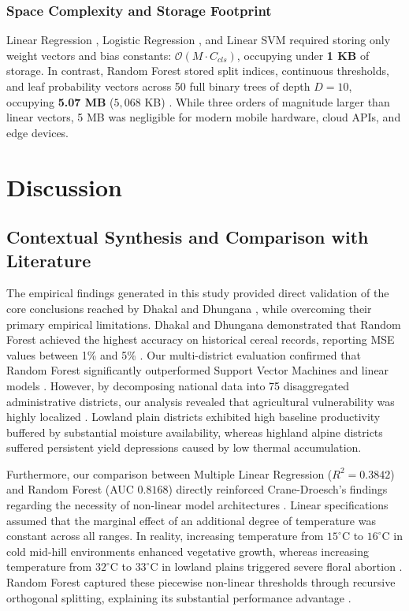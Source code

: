 \documentclass[conference]{IEEEtran}
\begin{document}
\subsubsection{Space Complexity and Storage Footprint}
Linear Regression \cite{hoerl1970}, Logistic Regression \cite{hastie2009}, and Linear SVM \cite{cortes1995} required storing only weight vectors and bias constants: $\mathcal{O}(M \cdot C_{cls})$, occupying under \textbf{1 KB} of storage. In contrast, Random Forest stored split indices, continuous thresholds, and leaf probability vectors across 50 full binary trees of depth $D=10$, occupying \textbf{5.07 MB} ($5,068$ KB) \cite{breiman2001}. While three orders of magnitude larger than linear vectors, 5 MB was negligible for modern mobile hardware, cloud APIs, and edge devices.

\section{Discussion}

\subsection{Contextual Synthesis and Comparison with Literature}
The empirical findings generated in this study provided direct validation of the core conclusions reached by Dhakal and Dhungana \cite{dhakal2023}, while overcoming their primary empirical limitations. Dhakal and Dhungana demonstrated that Random Forest achieved the highest accuracy on historical cereal records, reporting MSE values between 1\% and 5\% \cite{dhakal2023}. Our multi-district evaluation confirmed that Random Forest \cite{breiman2001} significantly outperformed Support Vector Machines \cite{cortes1995} and linear models \cite{hoerl1970}. However, by decomposing national data into 75 disaggregated administrative districts, our analysis revealed that agricultural vulnerability was highly localized \cite{macqueen1967}. Lowland plain districts exhibited high baseline productivity buffered by substantial moisture availability, whereas highland alpine districts suffered persistent yield depressions caused by low thermal accumulation.

Furthermore, our comparison between Multiple Linear Regression ($R^2 = 0.3842$) \cite{hoerl1970} and Random Forest (AUC $0.8168$) \cite{breiman2001} directly reinforced Crane-Droesch's findings regarding the necessity of non-linear model architectures \cite{crane2018}. Linear specifications assumed that the marginal effect of an additional degree of temperature was constant across all ranges. In reality, increasing temperature from $15^\circ\text{C}$ to $16^\circ\text{C}$ in cold mid-hill environments enhanced vegetative growth, whereas increasing temperature from $32^\circ\text{C}$ to $33^\circ\text{C}$ in lowland plains triggered severe floral abortion \cite{schlenker2009}. Random Forest captured these piecewise non-linear thresholds through recursive orthogonal splitting, explaining its substantial performance advantage \cite{breiman2001}.
\end{document}
